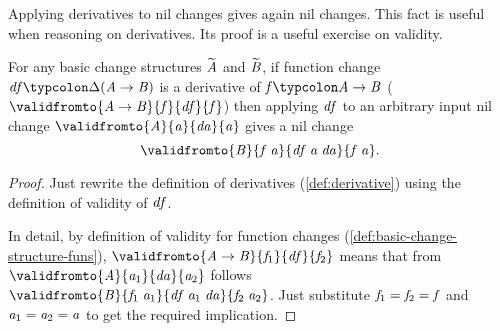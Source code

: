 Applying derivatives to nil changes gives again nil changes. This fact is useful
when reasoning on derivatives. Its proof is a useful exercise on validity.
\begin{lemma}
  \label{lem:derivatives-nil-changes}
  For any basic change structures \ensuremath{\widetilde{\Conid{A}}} and \ensuremath{\widetilde{\Conid{B}}},
  if
  function change \ensuremath{\Varid{df}\typcolon\Delta (\Conid{A}\to \Conid{B})} is a derivative of \ensuremath{\Varid{f}\typcolon\Conid{A}\to \Conid{B}} (\ensuremath{\validfromto{\Conid{A}\to \Conid{B}}{\Varid{f}}{\Varid{df}}{\Varid{f}}}) then applying \ensuremath{\Varid{df}}
  to an arbitrary input nil change \ensuremath{\validfromto{\Conid{A}}{\Varid{a}}{\Varid{da}}{\Varid{a}}} gives a nil change
  \[\ensuremath{\validfromto{\Conid{B}}{\Varid{f}\;\Varid{a}}{\Varid{df}\;\Varid{a}\;\Varid{da}}{\Varid{f}\;\Varid{a}}}.\]
\end{lemma}
\begin{proof}
  Just rewrite the definition of derivatives (\cref{def:derivative}) using the
  definition of validity of \ensuremath{\Varid{df}}.

  In detail, by definition of validity for function changes
  (\cref{def:basic-change-structure-funs}), \ensuremath{\validfromto{\Conid{A}\to \Conid{B}}{\Varid{f}_{1}}{\Varid{df}}{\Varid{f}_{2}}} means
  that from \ensuremath{\validfromto{\Conid{A}}{\Varid{a}_{1}}{\Varid{da}}{\Varid{a}_{2}}} follows \ensuremath{\validfromto{\Conid{B}}{\Varid{f}_{1}\;\Varid{a}_{1}}{\Varid{df}\;\Varid{a}_{1}\;\Varid{da}}{\Varid{f}_{2}\;\Varid{a}_{2}}}.
  Just substitute \ensuremath{\Varid{f}_{1}\mathrel{=}\Varid{f}_{2}\mathrel{=}\Varid{f}} and \ensuremath{\Varid{a}_{1}\mathrel{=}\Varid{a}_{2}\mathrel{=}\Varid{a}} to get the required
  implication.
\end{proof}

